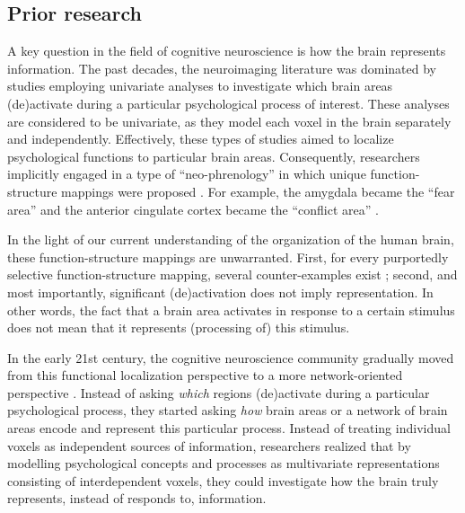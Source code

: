\documentclass[12pt,a4paper]{article}\usepackage[]{graphicx}\usepackage[]{color}
\begin{document}
\subsection{Prior research}
A key question in the field of cognitive neuroscience is how the brain represents information. The past decades, the neuroimaging literature was dominated by studies employing univariate analyses to investigate which brain areas (de)activate during a particular psychological process of interest. These analyses are considered to be univariate, as they model each voxel in the brain separately and independently. Effectively, these types of studies aimed to localize psychological functions to particular brain areas. Consequently, researchers implicitly engaged in a type of ``neo-phrenology'' in which unique function-structure mappings were proposed \citep{poldrack2010}. For example, the amygdala became the ``fear area'' \citep{ledoux2003} and the anterior cingulate cortex became the ``conflict area'' \citep{vanveen2002}.  

In the light of our current understanding of the organization of the human brain, these function-structure mappings are unwarranted. First, for every purportedly selective function-structure mapping, several counter-examples exist \citep{poldrack2010}; second, and most importantly, significant (de)activation does not imply representation. In other words, the fact that a brain area activates in response to a certain stimulus does not mean that it represents (processing of) this stimulus.   

In the early 21st century, the cognitive neuroscience community gradually moved from this functional localization perspective to a more network-oriented perspective \citep{sporns2002,barrett2013}. Instead of asking \emph{which} regions (de)activate during a particular psychological process, they started asking \emph{how} brain areas or a network of brain areas encode and represent this particular process. Instead of treating individual voxels as independent sources of information, researchers realized that by modelling psychological concepts and processes as multivariate representations consisting of interdependent voxels, they could investigate how the brain truly represents, instead of responds to, information.
\end{document}
